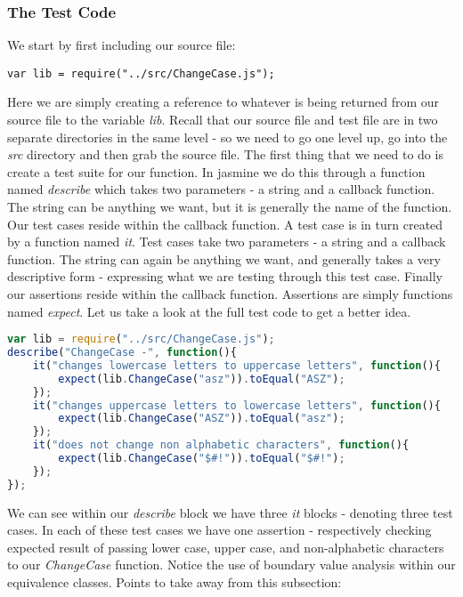 \documentclass{article}
\begin{document}
\subsubsection{The Test Code}
We start by first including our source file:
\begin{verbatim}
var lib = require("../src/ChangeCase.js");
\end{verbatim}
Here we are simply creating a reference to whatever is being returned from our source file to the variable \textit{lib}.
Recall that our source file and test file are in two separate directories in the same level - so we need to go one level up,
go into the \textit{src} directory and then grab the source file.
The first thing that we need to do is create a test suite for our function.
In jasmine we do this through a function named \textit{describe} which takes two parameters - a string and a callback function.
The string can be anything we want, but it is generally the name of the function.
Our test cases reside within the callback function. A test case is in turn created by a function named \textit{it}.
Test cases take two parameters - a string and a callback function. The string can again be anything we want, and generally
takes a very descriptive form - expressing what we are testing through this test case.
Finally our assertions reside within the callback function. Assertions are simply functions named \textit{expect}.
Let us take a look at the full test code to get a better idea.
\begin{lstlisting}[language=JavaScript]
var lib = require("../src/ChangeCase.js");
describe("ChangeCase -", function(){
	it("changes lowercase letters to uppercase letters", function(){
		expect(lib.ChangeCase("asz")).toEqual("ASZ");
	});
	it("changes uppercase letters to lowercase letters", function(){
		expect(lib.ChangeCase("ASZ")).toEqual("asz");
	});
	it("does not change non alphabetic characters", function(){
		expect(lib.ChangeCase("$#!")).toEqual("$#!");
	});
});
\end{lstlisting}
We can see within our \textit{describe} block we have three \textit{it} blocks - denoting three test cases.
In each of these test cases we have one assertion - respectively checking expected result of passing lower case, upper case, and
non-alphabetic characters to our \textit{ChangeCase} function.
Notice the use of boundary value analysis within our equivalence classes.
Points to take away from this subsection:
\end{document}
